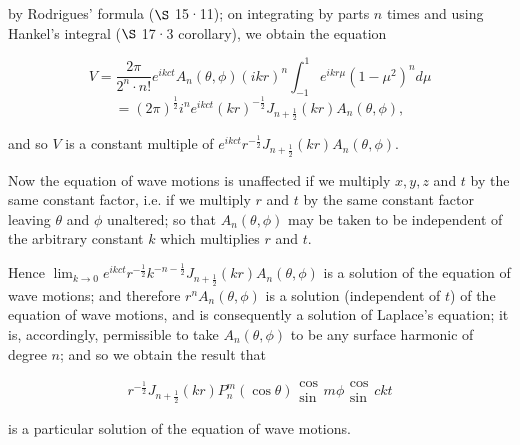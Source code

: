 \documentclass{article}
\begin{document}
by Rodrigues' formula ($\S$ 15·11); on integrating by parts $n$ times and using Hankel's integral ($\S$ 17·3 corollary), we obtain the equation

\[V = \frac{2\pi}{2^n \cdot n!} e^{ikct} A_n (\theta, \phi) (ikr)^n \int_{-1}^1 e^{ikr\mu} (1 - \mu^2)^n d\mu\]
\[= (2\pi)^{\frac{1}{2}} i^n e^{ikct} (kr)^{-\frac{1}{2}} J_{n+\frac{1}{2}} (kr) A_n (\theta, \phi),\]

and so $V$ is a constant multiple of $e^{ikct} r^{-\frac{1}{2}} J_{n+\frac{1}{2}} (kr) A_n (\theta, \phi)$.

Now the equation of wave motions is unaffected if we multiply $x, y, z$ and $t$ by the same constant factor, i.e. if we multiply $r$ and $t$ by the same constant factor leaving $\theta$ and $\phi$ unaltered; so that $A_n(\theta, \phi)$ may be taken to be independent of the arbitrary constant $k$ which multiplies $r$ and $t$.

Hence $\lim_{k \to 0} e^{ikct} r^{-\frac{1}{2}} k^{-n-\frac{1}{2}} J_{n+\frac{1}{2}} (kr) A_n (\theta, \phi)$ is a solution of the equation of wave motions; and therefore $r^n A_n (\theta, \phi)$ is a solution (independent of $t$) of the equation of wave motions, and is consequently a solution of Laplace's equation; it is, accordingly, permissible to take $A_n (\theta, \phi)$ to be any surface harmonic of degree $n$; and so we obtain the result that

\[r^{-\frac{1}{2}} J_{n+\frac{1}{2}} (kr) P_n^m (\cos \theta) \begin{array}{c} \cos \\ \sin \end{array} m\phi \begin{array}{c} \cos \\ \sin \end{array} ckt\]

is a particular solution of the equation of wave motions.
\end{document}
